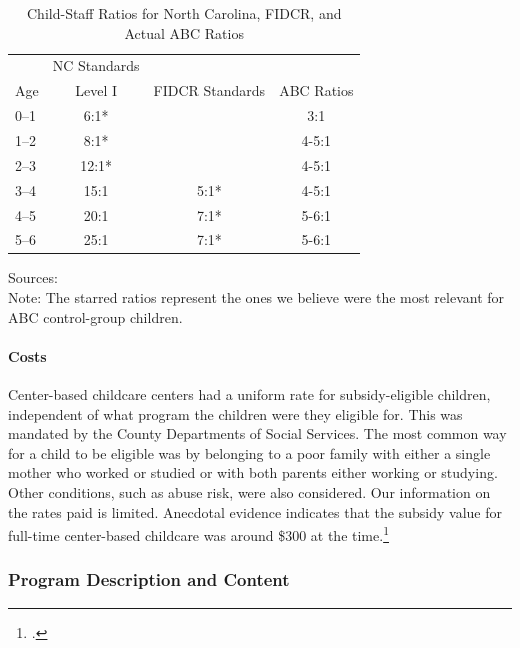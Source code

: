 \begin{table}[H]
\caption{Child-Staff Ratios for North Carolina, FIDCR, and Actual ABC Ratios}
\label{table:staff}
\begin{threeparttable}
\begin{tabular}{lccc}
\hline \hline
 &NC Standards &	&  \\
Age	& Level I & FIDCR Standards  & ABC Ratios\\ \hline
0--1	& 6:1*	&  				& 	3:1					\\
1--2	& 8:1* 	& 				&   4-5:1				\\
2--3	& 12:1* & 				& 	4-5:1				\\
3--4	& 15:1 	& 		5:1*	& 	4-5:1 				\\
4--5	& 20:1 	& 		7:1*	& 	5-6:1 				\\
5--6 & 25:1  &		7:1*	&	5-6:1				\\
\hline \hline
\end{tabular}
\begin{tablenotes}
\footnotesize
Sources: \cite{Department-of-Health_1968_DayCareRequirements,NCGA_1971_House-Bill-100,Ramey-et-al_1977_Intro-to-ABC,Ramey_Campbell_1979_SR,Ramey_McGinness_etal_1982_Abecedarianapproach} \\
Note: The starred ratios represent the ones we believe were the most relevant for ABC control-group children.
\end{tablenotes}
\end{threeparttable}
\end{table}

\paragraph{Costs}

\noindent Center-based childcare centers had a uniform rate for subsidy-eligible children, independent of what program the children were they eligible for. This was mandated by the County Departments of Social Services. The most common way for a child to be eligible was by belonging to a poor family with either a single mother who worked or studied or with both parents either working or studying. Other conditions, such as abuse risk, were also considered. Our information on the rates paid is limited. Anecdotal evidence indicates that the subsidy value for full-time center-based childcare was around \$300 at the time.\footnote{\citet{Kuperman_2015_Clifford-Russell-Interview}.}

\subsubsection{Program Description and Content}

